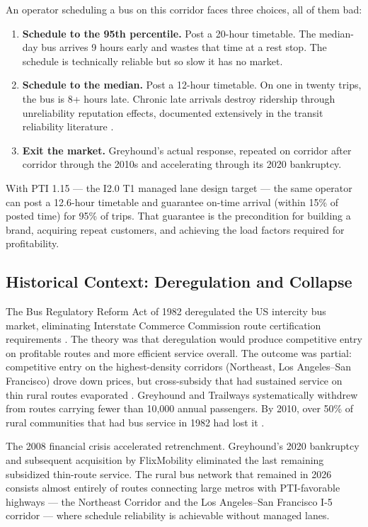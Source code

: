 An operator scheduling a bus on this corridor faces three choices, all of them bad:
\begin{enumerate}
  \item \textbf{Schedule to the 95th percentile.} Post a 20-hour timetable. The median-day bus arrives 9 hours early and wastes that time at a rest stop. The schedule is technically reliable but so slow it has no market.
  \item \textbf{Schedule to the median.} Post a 12-hour timetable. On one in twenty trips, the bus is 8+ hours late. Chronic late arrivals destroy ridership through unreliability reputation effects, documented extensively in the transit reliability literature \citep{Taylor2006}.
  \item \textbf{Exit the market.} Greyhound's actual response, repeated on corridor after corridor through the 2010s and accelerating through its 2020 bankruptcy.
\end{enumerate}

With PTI 1.15 --- the I2.0 T1 managed lane design target \citep{ROUTE_E2} --- the same operator can post a 12.6-hour timetable and guarantee on-time arrival (within 15\% of posted time) for 95\% of trips. That guarantee is the precondition for building a brand, acquiring repeat customers, and achieving the load factors required for profitability.

\subsection{Historical Context: Deregulation and Collapse}

The Bus Regulatory Reform Act of 1982 deregulated the US intercity bus market, eliminating Interstate Commerce Commission route certification requirements \citep{BusRegulatoryReform1982}. The theory was that deregulation would produce competitive entry on profitable routes and more efficient service overall. The outcome was partial: competitive entry on the highest-density corridors (Northeast, Los Angeles--San Francisco) drove down prices, but cross-subsidy that had sustained service on thin rural routes evaporated \citep{Schwieterman2019}. Greyhound and Trailways systematically withdrew from routes carrying fewer than 10,000 annual passengers. By 2010, over 50\% of rural communities that had bus service in 1982 had lost it \citep{Schwieterman2019}.

The 2008 financial crisis accelerated retrenchment. Greyhound's 2020 bankruptcy and subsequent acquisition by FlixMobility eliminated the last remaining subsidized thin-route service. The rural bus network that remained in 2026 consists almost entirely of routes connecting large metros with PTI-favorable highways --- the Northeast Corridor and the Los Angeles--San Francisco I-5 corridor --- where schedule reliability is achievable without managed lanes.

